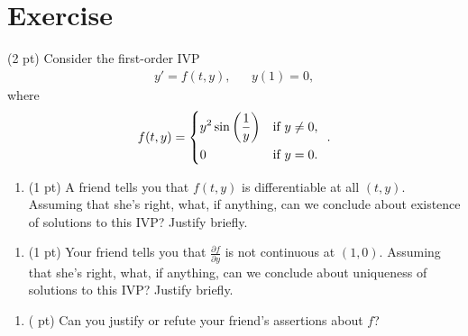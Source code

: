 \section{Exercise}


(2 pt) Consider the first-order IVP
\begin{align*}
y'
=
f(t,y),
&&
y(1)
=
0,
\end{align*}
where
\begin{align*}
f(t,y)
=
\begin{dcases*}
y^{2} \sin\left(\frac{1}{y}\right)	&	if $y \neq 0$,	\\
0						&	if $y = 0$.
\end{dcases*}%
.
\end{align*}
\begin{enumerate}[label=(\alph*)]
\item (1 pt) A friend tells you that $f(t,y)$ is differentiable at all $(t,y)$. Assuming that she's right, what, if anything, can we conclude about existence of solutions to this IVP? Justify briefly.
\end{enumerate}




\begin{enumerate}[resume,label=(\alph*)]
\item (1 pt) Your friend tells you that $\frac{\partial f}{\partial y}$ is not continuous at $(1,0)$. Assuming that she's right, what, if anything, can we conclude about uniqueness of solutions to this IVP? Justify briefly.
\end{enumerate}




\begin{enumerate}[resume,label=(\alph*)]
\item (\Heart{} pt) Can you justify or refute your friend's assertions about $f$?
\end{enumerate}

